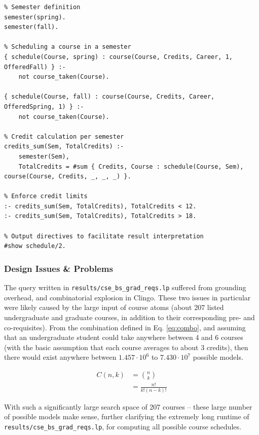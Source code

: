 \documentclass[12pt]{article}
\begin{document}
    \begin{lstlisting}
% Semester definition
semester(spring).
semester(fall).

% Scheduling a course in a semester
{ schedule(Course, spring) : course(Course, Credits, Career, 1, OfferedFall) } :-
    not course_taken(Course).

{ schedule(Course, fall) : course(Course, Credits, Career, OfferedSpring, 1) } :-
    not course_taken(Course).

% Credit calculation per semester
credits_sum(Sem, TotalCredits) :-
    semester(Sem),
    TotalCredits = #sum { Credits, Course : schedule(Course, Sem), course(Course, Credits, _, _, _) }.

% Enforce credit limits
:- credits_sum(Sem, TotalCredits), TotalCredits < 12.
:- credits_sum(Sem, TotalCredits), TotalCredits > 18.

% Output directives to facilitate result interpretation
#show schedule/2.
    \end{lstlisting}


    \subsubsection{Design Issues \& Problems}
    \label{subsubsec:des-iss-probs}

    The query written in {\tt{results/cse\_bs\_grad\_reqs.lp}} suffered from grounding overhead, and combinatorial explosion in Clingo. These two issues in particular were likely caused by the large input of course atoms (about 207 listed undergraduate and graduate courses, in addition to their corresponding pre- and co-requisites). From the combination defined in Eq. \ref{eq:combo}, and assuming that an undergraduate student could take anywhere between 4 and 6 courses (with the basic assumption that each course averages to about 3 credits), then there would exist anywhere between $1.457 \cdot 10^6$ to $7.430 \cdot 10^7$ possible models.

    \begin{equation}
        \begin{aligned}
            C(n, k) & = \binom{n}{k} \\
            & =\frac{n!}{k!(n-k)!}
        \end{aligned}
        \label{eq:combo}
    \end{equation}

    With such a significantly large search space of 207 courses -- these large number of possible models make sense, further clarifying the extremely long runtime of {\tt{results/cse\_bs\_grad\_reqs.lp}}, for computing all possible course schedules.
\end{document}

